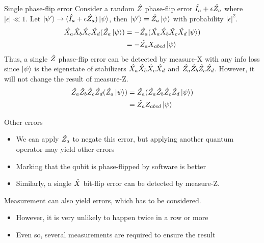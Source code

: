 \documentclass{beamer}
\begin{document}
    \begin{frame}{Single phase-flip error}
        Consider a random $ \shat{Z} $ phase-flip error $ \sshat{I_a} + \epsilon \sshat{Z_a} $ where $ \lvert\epsilon\rvert \ll 1 $. Let $ \ket{\psi'} \to (\sshat{I_a} + \epsilon \sshat{Z_a}) \ket{\psi} $, then $ \ket{\psi'} = \sshat{Z_a}\ket{\psi} $ with probability $ \lvert\epsilon\rvert^2 $.
        \begin{equation}
        \begin{split}
       \sshat{X_a}\sshat{X_b}\sshat{X_c}\sshat{X_d}(\sshat{Z_a} \ket{\psi}) &= -\sshat{Z_a}(\sshat{X_a}\sshat{X_b}\sshat{X_c}\sshat{X_d}\ket{\psi}) \\
       &= -\sshat{Z_a}X_{abcd}\ket{\psi}
        \end{split}
        \end{equation}
        Thus, a single $ \shat{Z} $ phase-flip error can be detected by measure-X with any info loss since $ \ket{\psi} $ is the eigenstate of stabilizers $ \sshat{X_a}\sshat{X_b}\sshat{X_c}\sshat{X_d} $ and $ \sshat{Z_a}\sshat{Z_b}\sshat{Z_c}\sshat{Z_d} $. However, it will not change the result of measure-Z.
        \begin{equation}
        \begin{split}
       \sshat{Z_a}\sshat{Z_b}\sshat{Z_c}\sshat{Z_d}(\sshat{Z_a} \ket{\psi}) &= \sshat{Z_a}(\sshat{Z_a}\sshat{Z_b}\sshat{Z_c}\sshat{Z_d}\ket{\psi}) \\
       &= \sshat{Z_a}Z_{abcd}\ket{\psi}
        \end{split}
        \end{equation}
    \end{frame}
    
    \begin{frame}{Other errors}
        \begin{itemize}
            \item We can apply $ \sshat{Z_a} $ to negate this error, but applying another quantum operator may yield other errors
            \item Marking that the qubit is phase-flipped by software is better
            \item Similarly, a single $ \shat{X} $ bit-flip error can be detected by measure-Z.
        \end{itemize}
        Measurement can also yield errors, which has to be considered.
        \begin{itemize}
            \item However, it is very unlikely to happen twice in a row or more
            \item Even so, several measurements are required to ensure the result
        \end{itemize}
    \end{frame}
    
\end{document}
